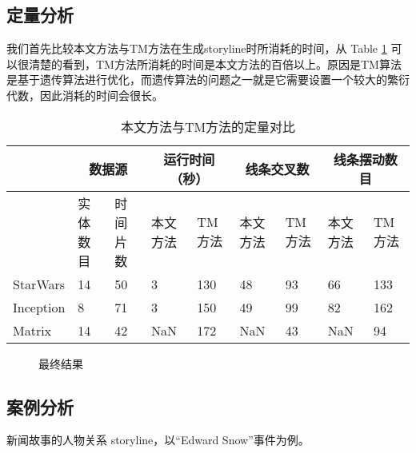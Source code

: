 \subsection{定量分析}
我们首先比较本文方法与TM方法在生成storyline时所消耗的时间，从 Table \ref{table:quantitative-analysis} 可以很清楚的看到，TM方法所消耗的时间是本文方法的百倍以上。原因是TM算法是基于遗传算法进行优化，而遗传算法的问题之一就是它需要设置一个较大的繁衍代数，因此消耗的时间会很长。
\begin{table}[htb]
\caption{本文方法与TM方法的定量对比}
\label{table:quantitative-analysis}
\begin{center}
  \begin{tabular}{|*{9}{l |}}\hline
                    & \multicolumn{2}{c|}{数据源} & \multicolumn{2}{c|}{运行时间（秒）} & \multicolumn{2}{c|}{线条交叉数} & \multicolumn{2}{c|}{线条摆动数目} \\ \hline
                    & 实体数目 &  时间片数 & 本文方法 & TM 方法 & 本文方法 & TM 方法 & 本文方法 & TM 方法 \\ \hline
    StarWars & 14           & 50             & 3              & 130       &  48          &  93         &  66           & 133        \\ \hline
    Inception &  8            & 71             & 3              & 150       &  49          &  99         &  82           & 162        \\ \hline
    Matrix      & 14           & 42             & NaN         & 172       &  NaN       &  43         &  NaN       & 94          \\ \hline
  \end{tabular}
\end{center}
\end{table}

\begin{figure}[htb]
	\centering
	\caption{最终结果}
	\label{fig:layout-sample}
\end{figure}

\subsection{案例分析}
新闻故事的人物关系 storyline，以“Edward Snow”事件为例。

